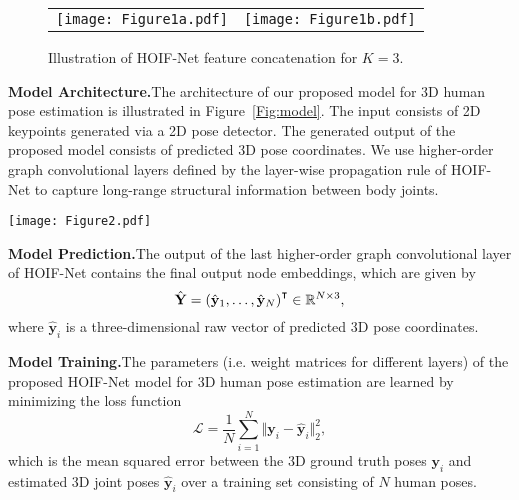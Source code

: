 \documentclass{bmvc2k}
\newcommand\T{{\mathpalette\raiseT\intercal}}
\newcommand\raiseT[2]{\setbox0\hbox{$#1{#2}$}\raise\dp0\box0}
\begin{document}
\begin{figure}[!htb]
\setlength{\tabcolsep}{1em}
\centering
\begin{tabular}{cc}
\texttt{[image: Figure1a.pdf]} &
\texttt{[image: Figure1b.pdf]}
\end{tabular}
\caption{Illustration of HOIF-Net feature concatenation for $K=3$.}
\label{Fig:humangraph2}
\end{figure}

\medskip\noindent\textbf{Model Architecture.}\quad The architecture of our proposed model for 3D human pose estimation is illustrated in Figure~\ref{Fig:model}. The input consists of 2D keypoints generated via a 2D pose detector. The generated output of the proposed model consists of predicted 3D pose coordinates. We use higher-order graph convolutional layers defined by the layer-wise propagation rule of HOIF-Net to capture long-range structural information between body joints.

\begin{figure*}[!htb]
\centering
\texttt{[image: Figure2.pdf]}
\caption{Overview of the proposed network architecture for 3D pose estimation. Our model takes 2D pose coordinates (17 joints) as input and generates 3D pose predictions (17 joints) as output. We use ten higher-order graph convolutional layers, each of which is followed by batch normalization and ReLU activation function, except the last convolutional layer.}
\label{Fig:model}
\end{figure*}

\medskip\noindent\textbf{Model Prediction.}\quad The output of the last higher-order graph convolutional layer of HOIF-Net contains the final output node embeddings, which are given by
\begin{equation}
\hat{\bm{Y}}=(\hat{\bm{y}}_{1},\dots,\hat{\bm{y}}_{N})^{\T}\in\mathbb{R}^{N\times 3},
\end{equation}
where $\hat{\bm{y}}_{i}$ is a three-dimensional raw vector of predicted 3D pose coordinates.

\medskip\noindent\textbf{Model Training.}\quad The parameters (i.e. weight matrices for different layers) of the proposed HOIF-Net model for 3D human pose estimation are learned by minimizing the loss function
\begin{equation}
\mathcal{L} =\frac{1}{N}\sum_{i=1}^{N}\Vert\bm{y}_{i}-\hat{\bm{y}}_{i}\Vert_{2}^{2},
\end{equation}
which is the mean squared error between the 3D ground truth poses $\bm{y}_{i}$ and estimated 3D joint poses $\hat{\bm{y}}_{i}$ over a training set consisting of $N$ human poses.
\end{document}

